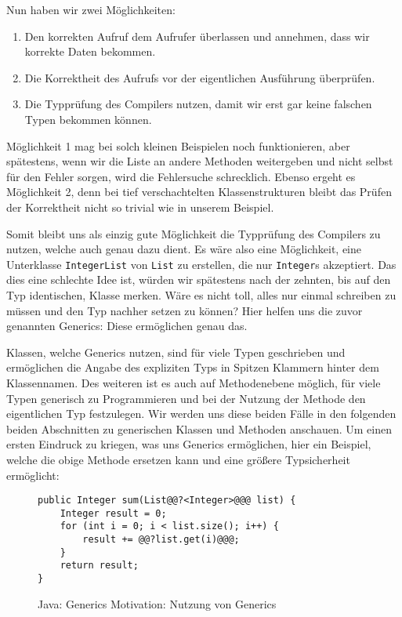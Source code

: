 		Nun haben wir zwei Möglichkeiten:
		\begin{enumerate}
			\item Den korrekten Aufruf dem Aufrufer überlassen und annehmen, dass wir korrekte Daten bekommen.
			\item Die Korrektheit des Aufrufs vor der eigentlichen Ausführung überprüfen.
			\item Die Typprüfung des Compilers nutzen, damit wir erst gar keine falschen Typen bekommen können.
		\end{enumerate}
		Möglichkeit 1 mag bei solch kleinen Beispielen noch funktionieren, aber spätestens, wenn wir die Liste an andere Methoden weitergeben und nicht selbst für den Fehler sorgen, wird die Fehlersuche schrecklich. Ebenso ergeht es Möglichkeit 2, denn bei tief verschachtelten Klassenstrukturen bleibt das Prüfen der Korrektheit nicht so trivial wie in unserem Beispiel.
		
		
		Somit bleibt uns als einzig gute Möglichkeit die Typprüfung des Compilers zu nutzen, welche auch genau dazu dient. Es wäre also eine Möglichkeit, eine Unterklasse \texttt{IntegerList} von \texttt{List} zu erstellen, die nur \texttt{Integer}s akzeptiert. Das dies eine schlechte Idee ist, würden wir spätestens nach der zehnten, bis auf den Typ identischen, Klasse merken. Wäre es nicht toll, alles nur einmal schreiben zu müssen und den Typ nachher setzen zu können? Hier helfen uns die zuvor genannten Generics: Diese ermöglichen genau das.
		
		Klassen, welche Generics nutzen, sind für viele Typen geschrieben und ermöglichen die Angabe des expliziten Typs in Spitzen Klammern hinter dem Klassennamen. Des weiteren ist es auch auf Methodenebene möglich, für viele Typen generisch zu Programmieren und bei der Nutzung der Methode den eigentlichen Typ festzulegen. Wir werden uns diese beiden Fälle in den folgenden beiden Abschnitten zu generischen Klassen und Methoden anschauen. Um einen ersten Eindruck zu kriegen, was uns Generics ermöglichen, hier ein Beispiel, welche die obige Methode ersetzen kann und eine größere Typsicherheit ermöglicht:
		\begin{figure}[H]
			\centering
			\begin{lstlisting}[style = base]
public Integer sum(List@@?<Integer>@@@ list) {
	Integer result = 0;
	for (int i = 0; i < list.size(); i++) {
		result += @@?list.get(i)@@@;
	}
	return result;
}
			\end{lstlisting}
			\caption{Java: Generics Motivation: Nutzung von Generics}
			\label{fig:java_generics_motivation_gen}
		\end{figure}
		
